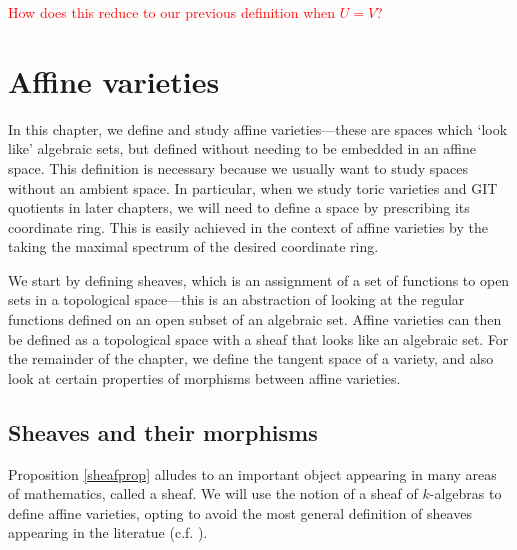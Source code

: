 \documentclass[12pt]{amsart}
\theoremstyle{plain}
\begin{document}
\textcolor{red}{How does this reduce to our previous definition when $U=V$?}










\newpage
{}
\section{Affine varieties}
In this chapter, we define and study affine varieties---these are spaces which `look like' algebraic sets, but defined without needing to be embedded in an affine space.
This definition is necessary because we usually want to study spaces without an ambient space.
In particular, when we study toric varieties and GIT quotients in later chapters, we will need to define a space by prescribing its coordinate ring.
This is easily achieved in the context of affine varieties by the taking the maximal spectrum of the desired coordinate ring.

We start by defining sheaves, which is an assignment of a set of functions to open sets in a topological space---this is an abstraction of looking at the regular functions defined on an open subset of an algebraic set.
Affine varieties can then be defined as a topological space with a sheaf that looks like an algebraic set.
For the remainder of the chapter, we define the tangent space of a variety, and also look at certain properties of morphisms between affine varieties.






\subsection{Sheaves and their morphisms}\label{varietiessection}
Proposition \ref{sheafprop} alludes to an important object appearing in many areas of mathematics, called a sheaf.
We will use the notion of a sheaf of $k$-algebras to define affine varieties, opting to avoid the most general definition of sheaves appearing in the literatue (c.f. {\cite[Chapter II, \S 1]{Hartshorne77}}).
\end{document}
